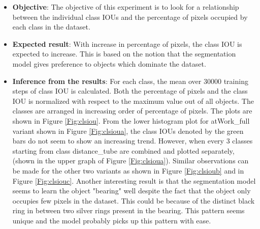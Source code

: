 		\begin{itemize}
			\item \textbf{Objective}: The objective of this experiment is to look for a relationship between the individual class IOUs and the percentage of pixels occupied by each class in the dataset. 
			\item \textbf{Expected result}: With increase in percentage of pixels, the class IOU is expected to increase. This is based on the notion that the segmentation model gives preference to objects which dominate the dataset. 
			\item \textbf{Inference from the results}: For each class, the mean over 30000 training steps of class IOU is calculated. Both the percentage of pixels and the class IOU is normalized with respect to the maximum value out of all objects. The classes are arranged in increasing order of percentage of pixels. The plots are shown in Figure \ref{Fig:clsiou}. From the lower histogram plot for atWork\_full variant shown in Figure \ref{Fig:clsioua}, the class IOUs denoted by the green bars do not seem to show an increasing trend. However, when every 3 classes starting from class distance\_tube are combined and plotted separately, (shown in the upper graph of Figure \ref{Fig:clsioua}). Similar observations can be made for the other two variants as shown in Figure \ref{Fig:clsioub} and in Figure \ref{Fig:clsiouc}. 
			Another interesting result is that the segmentation model seems to learn the object "bearing" well despite the fact that the object only occupies few pixels in the dataset. This could be because of the distinct black ring in between two silver rings present in the bearing. This pattern seems unique and the model probably picks up this pattern with ease.
		\end{itemize}
	
